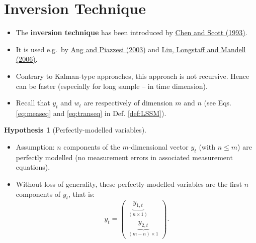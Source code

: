 \documentclass[
  12pt,
]{book}
\providecommand{\tightlist}{%
  \setlength{\itemsep}{0pt}\setlength{\parskip}{0pt}}
\theoremstyle{definition}
\theoremstyle{definition}
\theoremstyle{definition}
\theoremstyle{definition}
\newtheorem{hypothesis}{Hypothesis}[chapter]
\theoremstyle{remark}
\begin{document}
\hypertarget{EstimationInversion}{%
\section{Inversion Technique}\label{EstimationInversion}}

\begin{itemize}
\tightlist
\item
  The \textbf{inversion technique} has been introduced by \href{http://www.iijournals.com/doi/abs/10.3905/jfi.1993.408090?journalCode=jfi}{Chen and Scott (1993)}.
\item
  It is used e.g.~by \href{http://web.stanford.edu/~piazzesi/AP.pdf}{Ang and Piazzesi (2003)} and \href{http://rady.ucsd.edu/faculty/directory/liu/pub/docs/rate-swaps.pdf}{Liu, Longstaff and Mandell (2006)}.
\item
  Contrary to Kalman-type approaches, this approach is not recursive. Hence can be faster (especially for long sample -- in time dimension).
\item
  Recall that \(y_t\) and \(w_t\) are respectively of dimension \(m\) and \(n\) (see Eqs. \eqref{eq:measeq} and \eqref{eq:transeq} in Def. \ref{def:LSSM}).
\end{itemize}

\begin{hypothesis}[Perfectly-modelled variables]
\protect\hypertarget{hyp:perfectlymodelled}{}\label{hyp:perfectlymodelled}\leavevmode

\begin{itemize}
\tightlist
\item
  Assumption: \(n\) components of the \(m\)-dimensional vector \(y_t\) (with \(n \le m\)) are perfectly modelled (no measurement errors in associated measurement equations).
\item
  Without loss of generality, these perfectly-modelled variables are the first \(n\) components of \(y_t\), that is:
  \[
  y_t =
  \left(\begin{array}{c}
  \underbrace{y_{1,t}}_{(n \times 1)} \\
  \underbrace{y_{2,t}}_{(m-n)\times1}
  \end{array}\right).
  \]
\end{itemize}

\end{hypothesis}
\end{document}
